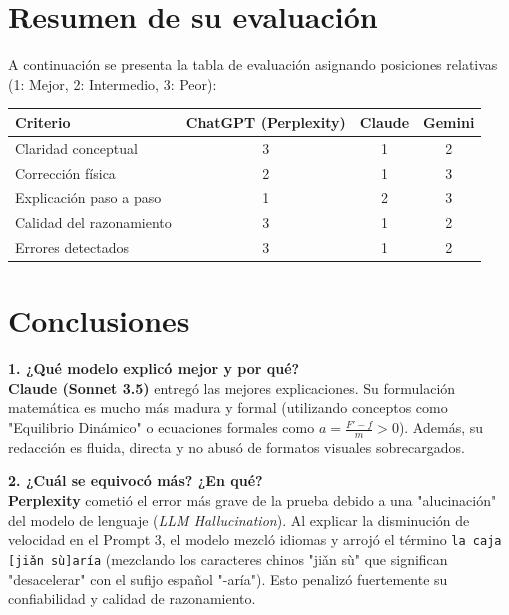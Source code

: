 \documentclass[11pt]{article}
\begin{document}
\newpage
\section*{Resumen de su evaluación}

A continuación se presenta la tabla de evaluación asignando posiciones relativas (1: Mejor, 2: Intermedio, 3: Peor):

\begin{table}[h]
	\centering
	\begin{tabular}{|l|c|c|c|}
		\hline
		\textbf{Criterio}        & \textbf{ChatGPT (Perplexity)} & \textbf{Claude} & \textbf{Gemini} \\ \hline
		Claridad conceptual      & 3                             & 1               & 2               \\ \hline
		Corrección física        & 2                             & 1               & 3               \\ \hline
		Explicación paso a paso  & 1                             & 2               & 3               \\ \hline
		Calidad del razonamiento & 3                             & 1               & 2               \\ \hline
		Errores detectados       & 3                             & 1               & 2               \\ \hline
	\end{tabular}
\end{table}

\section*{Conclusiones}

\textbf{1. ¿Qué modelo explicó mejor y por qué?} \\
\textbf{Claude (Sonnet 3.5)} entregó las mejores explicaciones. Su formulación matemática es mucho más madura y formal (utilizando conceptos como "Equilibrio Dinámico" o ecuaciones formales como $a = \frac{F' - f}{m} > 0$). Además, su redacción es fluida, directa y no abusó de formatos visuales sobrecargados.

\vspace{0.3cm}
\textbf{2. ¿Cuál se equivocó más? ¿En qué?} \\
\textbf{Perplexity} cometió el error más grave de la prueba debido a una "alucinación" del modelo de lenguaje (\textit{LLM Hallucination}). Al explicar la disminución de velocidad en el Prompt 3, el modelo mezcló idiomas y arrojó el término \texttt{la caja [jiǎn sù]aría} (mezclando los caracteres chinos "jiǎn sù" que significan "desacelerar" con el sufijo español "-aría"). Esto penalizó fuertemente su confiabilidad y calidad de razonamiento.
\end{document}
